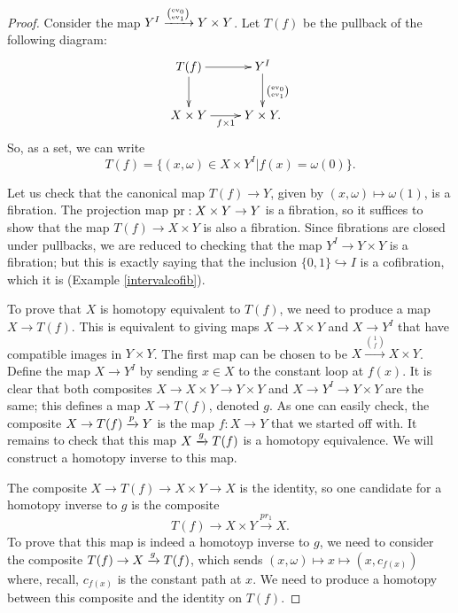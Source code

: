 \begin{proof}
    Consider the map $Y^I\xrightarrow{\binom{\mathrm{ev}_0}{\mathrm{ev}_1}}Y\times Y$.
    Let $T(f)$ be the pullback of the following diagram:
	\begin{equation*}
	    \xymatrix{
	T(f)\ar[r]\ar[d] & Y^I\ar[d]^{\binom{\ev_0}{\ev_1}}\\
		    X\times Y\ar[r]_{f\times 1} & Y\times Y.
		}
	\end{equation*}
	So, as a set, we can write
	$$T(f)=\{(x,\omega)\in X\times Y^I|f(x) = \omega(0)\}.$$

	Let us check that the canonical map $T(f) \to Y$, given by $(x,\omega) \mapsto \omega(1)$, is a fibration.
	The projection map $\mathrm{pr}: X\times Y\to Y$ is a fibration, so it suffices to show that the map $T(f) \to X\times Y$
	is also a fibration.
	Since fibrations are closed under pullbacks, we are reduced to checking that the map $Y^I\to Y\times Y$ is a fibration;
	but this is exactly saying that the inclusion $\{0,1\} \hookrightarrow I$ is a cofibration, which it is
	(Example \ref{intervalcofib}).

	To prove that $X$ is homotopy equivalent to $T(f)$, we need to produce a map $X\to T(f)$.
	This is equivalent to giving maps $X\to X\times Y$ and $X\to Y^I$ that have compatible images in $Y\times Y$.
	The first map can be chosen to be $X\xrightarrow{\binom{1}{f}}X\times Y$.
	Define the map $X\to Y^I$ by sending $x\in X$ to the constant loop at $f(x)$.
	It is clear that both composites $X\to X\times Y\to Y\times Y$ and $X\to Y^I\to Y\times Y$ are the same;
	this defines a map $X\to T(f)$, denoted $g$.
	As one can easily check, the composite $X\to T(f)\xrightarrow{{p}} Y$ is the map $f:X\to Y$ that we started off with.
	It remains to check that this map $X\xrightarrow{{g}} T(f)$ is a homotopy equivalence.
	We will construct a homotopy inverse to this map.

	The composite $X\to T(f)\to X\times Y\to X$ is the identity, so one candidate for a homotopy inverse to $g$ is
	the composite
	$$T(f)\to X\times Y\xrightarrow{pr_1} X.$$
	To prove that this map is indeed a homotoyp inverse to $g$, we need to consider the composite
	$T(f)\to X\xrightarrow{{g}} T(f)$, which sends $(x,\omega)\mapsto x\mapsto (x,c_{f(x)})$ where,
	recall, $c_{f(x)}$ is the constant path at $x$.
	We need to produce a homotopy between this composite and the identity on $T(f)$.
	

\end{proof}

